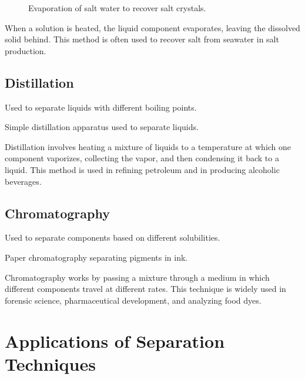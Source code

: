 \begin{figure}[h]
  \caption{Evaporation of salt water to recover salt crystals.}
  \label{fig:evaporation}
\end{figure}

When a solution is heated, the liquid component evaporates, leaving the dissolved solid behind. This method is often used to recover salt from seawater in salt production.

\FloatBarrier %

\subsection{Distillation}
Used to separate liquids with different boiling points.

\begin{marginfigure}[0pt]
  \caption{Simple distillation apparatus used to separate liquids.}
  \label{fig:distillation}
\end{marginfigure}

Distillation involves heating a mixture of liquids to a temperature at which one component vaporizes, collecting the vapor, and then condensing it back to a liquid. This method is used in refining petroleum and in producing alcoholic beverages.

\subsection{Chromatography}
Used to separate components based on different solubilities.

\begin{marginfigure}[0pt]
  \caption{Paper chromatography separating pigments in ink.}
  \label{fig:chromatography}
\end{marginfigure}

Chromatography works by passing a mixture through a medium in which different components travel at different rates. This technique is widely used in forensic science, pharmaceutical development, and analyzing food dyes.

\FloatBarrier %

\section{Applications of Separation Techniques}

